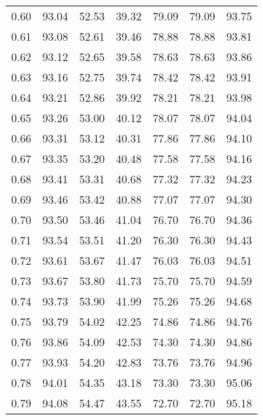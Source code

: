 \begin{tabular}{|c|c|c|c|c|c|c|}
      0.60 &     93.04 &     52.53 &      39.32 &   79.09 &      79.09 &         93.75 \\
      0.61 &     93.08 &     52.61 &      39.46 &   78.88 &      78.88 &         93.81 \\
      0.62 &     93.12 &     52.65 &      39.58 &   78.63 &      78.63 &         93.86 \\
      0.63 &     93.16 &     52.75 &      39.74 &   78.42 &      78.42 &         93.91 \\
      0.64 &     93.21 &     52.86 &      39.92 &   78.21 &      78.21 &         93.98 \\
      0.65 &     93.26 &     53.00 &      40.12 &   78.07 &      78.07 &         94.04 \\
      0.66 &     93.31 &     53.12 &      40.31 &   77.86 &      77.86 &         94.10 \\
      0.67 &     93.35 &     53.20 &      40.48 &   77.58 &      77.58 &         94.16 \\
      0.68 &     93.41 &     53.31 &      40.68 &   77.32 &      77.32 &         94.23 \\
      0.69 &     93.46 &     53.42 &      40.88 &   77.07 &      77.07 &         94.30 \\
      0.70 &     93.50 &     53.46 &      41.04 &   76.70 &      76.70 &         94.36 \\
      0.71 &     93.54 &     53.51 &      41.20 &   76.30 &      76.30 &         94.43 \\
      0.72 &     93.61 &     53.67 &      41.47 &   76.03 &      76.03 &         94.51 \\
      0.73 &     93.67 &     53.80 &      41.73 &   75.70 &      75.70 &         94.59 \\
      0.74 &     93.73 &     53.90 &      41.99 &   75.26 &      75.26 &         94.68 \\
      0.75 &     93.79 &     54.02 &      42.25 &   74.86 &      74.86 &         94.76 \\
      0.76 &     93.86 &     54.09 &      42.53 &   74.30 &      74.30 &         94.86 \\
      0.77 &     93.93 &     54.20 &      42.83 &   73.76 &      73.76 &         94.96 \\
      0.78 &     94.01 &     54.35 &      43.18 &   73.30 &      73.30 &         95.06 \\
      0.79 &     94.08 &     54.47 &      43.55 &   72.70 &      72.70 &         95.18 \\

\end{tabular}
